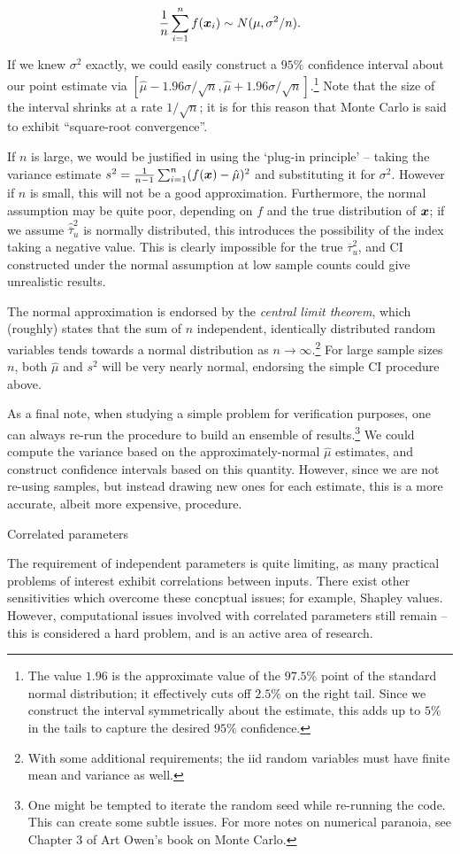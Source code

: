 \documentclass[../primer.tex]{subfiles}
\begin{document}
\begin{equation}\label{eq:est-dist}
  \frac{1}{n}\sum_{i=1}^n f(\boldsymbol{x}_i) \sim N(\mu,\sigma^2/n).
\end{equation}

\noindent If we knew \(\sigma^2\) exactly, we could easily construct a \(95\%\)
confidence interval about our point estimate via
\([\hat{\mu}-1.96\sigma/\sqrt{n},\hat{\mu}+1.96\sigma/\sqrt{n}]\).\footnote{The value
\(1.96\) is the approximate value of the \(97.5\%\) point of the standard normal
distribution; it effectively cuts off \(2.5\%\) on the right tail. Since we
construct the interval symmetrically about the estimate, this adds up to \(5\%\)
in the tails to capture the desired \(95\%\) confidence.} Note that the size of
the interval shrinks at a rate \(1/\sqrt{n}\); it is for this reason that Monte
Carlo is said to exhibit ``square-root convergence''.

If \(n\) is large, we would be justified in using the `plug-in principle' --
taking the variance estimate \(s^2=\frac{1}{n-1}\sum_{i=1}^n(f(\boldsymbol{x})-\hat{\mu})^2\)
and substituting it for \(\sigma^2\). However if \(n\) is small, this will not be a
good approximation. Furthermore, the normal assumption may be quite poor,
depending on \(f\) and the true distribution of \(\boldsymbol{x}\); if we assume
\(\hat{\overline{\tau}}_u^2\) is normally distributed, this introduces the
possibility of the index taking a negative value. This is clearly impossible for
the true \(\overline{\tau}_u^2\), and CI constructed under the normal assumption
at low sample counts could give unrealistic results.

The normal approximation is endorsed by the \emph{central limit theorem}, which
(roughly) states that the sum of \(n\) independent, identically distributed random
variables tends towards a normal distribution as \(n\to\infty\).\footnote{With some
additional requirements; the iid random variables must have finite mean and
variance as well.} For large sample sizes \(n\), both \(\hat{\mu}\) and \(s^2\) will
be very nearly normal, endorsing the simple CI procedure above.

As a final note, when studying a simple problem for verification purposes, one
can always re-run the procedure to build an ensemble of results.\footnote{One might
be tempted to iterate the random seed while re-running the code. This can create
some subtle issues. For more notes on numerical paranoia, see Chapter 3 of Art
Owen's book on Monte Carlo.\cite{owen2013montecarlo}} We could compute the
variance based on the approximately-normal \(\hat{\mu}\) estimates, and construct
confidence intervals based on this quantity. However, since we are not re-using
samples, but instead drawing new ones for each estimate, this is a more
accurate, albeit more expensive, procedure.

Correlated parameters

The requirement of independent parameters is quite limiting, as many practical
problems of interest exhibit correlations between inputs. There exist other
sensitivities which overcome these concptual issues; for example, Shapley
values. \cite{owen2017shapley} However, computational issues involved with
correlated parameters still remain -- this is considered a hard problem, and is
an active area of research.
\end{document}
